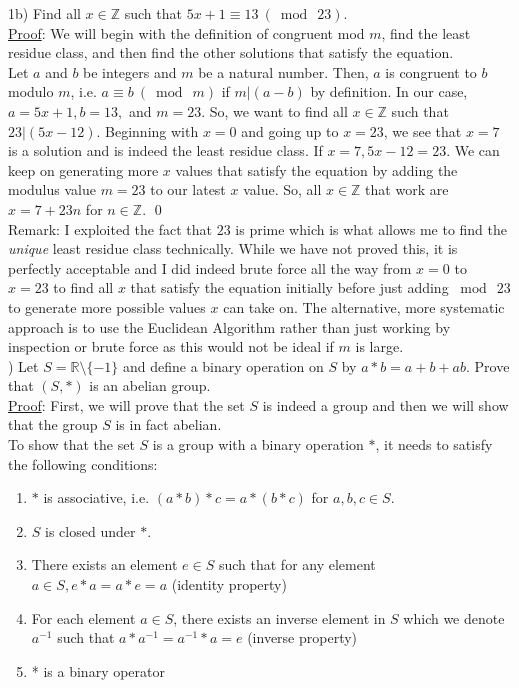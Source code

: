 \documentclass{article}
\begin{document}
\noindent 1b) Find all $x \in \mathbb{Z}$ such that $5x + 1 \equiv 13\ (\bmod\ 23) $. \\

\noindent
\underline{Proof}: We will begin with the definition of congruent mod $m$, find the least residue class, and then find the other solutions that satisfy the equation. \\

\noindent
Let $a$ and $b$ be integers and $m$ be a natural number. Then, $a$ is congruent to $b$ modulo $m$, i.e. $a \equiv b\ (\bmod\ m)$ if $m \rvert (a-b)$ by definition. In our case, $a = 5x + 1, b = 13,$ and $m = 23$. So, we want to find all $x \in \mathbb{Z}$ such that $23 \rvert (5x-12)$. Beginning with $x = 0$ and going up to $x = 23$, we see that $x = 7$ is a solution and is indeed the least residue class. If $x = 7, 5x-12 = 23$. We can keep on generating more $x$ values that satisfy the equation by adding the modulus value $m = 23$ to our latest $x$ value. So, all $x \in \mathbb{Z}$ that work are $x = 7 + 23n$ for $n \in \mathbb{Z}$. \qed \\

\noindent
Remark: I exploited the fact that $23$ is prime which is what allows me to find the \textit{unique} least residue class technically. While we have not proved this, it is perfectly acceptable and I did indeed brute force all the way from $x = 0$ to $x = 23$ to find all $x$ that satisfy the equation initially before just adding $\bmod\ 23$ to generate more possible values $x$ can take on.  The alternative, more systematic approach is to use the Euclidean Algorithm rather than just working by inspection or brute force as this would not be ideal if $m$ is large. \\

) Let $S = \mathbb{R} \setminus \{-1\}$ and define a binary operation on $S$ by $a * b = a + b + ab.$ Prove that $(S, *)$ is an abelian group. \\

\noindent
\underline{Proof}: First, we will prove that the set $S$ is indeed a group and then we will show that the group $S$ is in fact abelian. \\

\noindent
To show that the set $S$ is a group with a binary operation $*$, it needs to satisfy the following conditions:
\begin{enumerate}
  \item $*$ is associative, i.e. $(a * b) * c = a * (b * c)$ for $a, b, c \in S$.
  \item $S$ is closed under $*$.
  \item There exists an element $e \in S$ such that for any element $a \in S, e * a = a * e = a$ (identity property)
  \item For each element $a \in S$, there exists an inverse element in $S$ which we denote $a^{-1}$ such that $a * a^{-1} = a^{-1} * a = e$ (inverse property)
  \item * is a binary operator
\end{enumerate}
\end{document}
